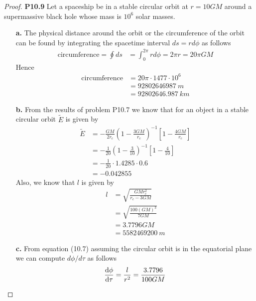 \documentclass[11pt]{article}
\theoremstyle{definition}
\begin{document}
\cleardoublepage
\begin{proof}{\textbf{P10.9}}
    Let a spaceship be in a stable circular orbit at $r = 10GM$ around a
    supermassive black hole whose mass is $10^6$ solar masses.
    \begin{itemize}
        \item [\textbf{a.}] The physical distance around the orbit or the
        circumference of the orbit can be found by integrating the spacetime
        interval $ds = rd\phi$ as follows
        \begin{align*}
            \text{circumference} = \oint ds
            &= \int_0^{2\pi} rd\phi = 2\pi r = 20\pi GM
        \end{align*}
        Hence 
        \begin{align*}
            \text{circumference}
            &= 20\pi \cdot 1477 \cdot 10^6\\
            &= 92802646987~m\\
            &= 92802646.987~km
        \end{align*}
        \item [\textbf{b.}] From the results of problem P10.7 we know that for
        an object in a stable circular orbit $\tilde{E}$ is given by
        \begin{align*}
            \tilde{E} &= - \frac{GM}{2r_c}\left(1 - \frac{3GM}{r_c}\right)^{-1}
            \left[1 - \frac{4GM}{r_c}\right]\\
            &= - \frac{1}{20}\left(1 - \frac{3}{10}\right)^{-1}
            \left[1 - \frac{4}{10}\right]\\
            &= - \frac{1}{20} \cdot 1.4285 \cdot 0.6\\
            &= -0.042855
        \end{align*}
        Also, we know that $l$ is given by
        \begin{align*}
            l &= \sqrt{\frac{GMr_c^2}{r_c - 3GM}}\\
            &= \sqrt{\frac{100(GM)^3}{7GM}}\\
            &= 3.7796 GM\\
            &= 5582469200~m
        \end{align*}
\cleardoublepage
        \item [\textbf{c.}] From equation (10.7) assuming the circular orbit is
        in the equatorial plane we can compute $d\phi/d\tau$ as follows
        \begin{align*}
            \dv{\phi}{\tau} = \frac{l}{r^2} = \frac{3.7796}{100 GM}

\end{align*}
\end{itemize}
\end{proof}
\end{document}
